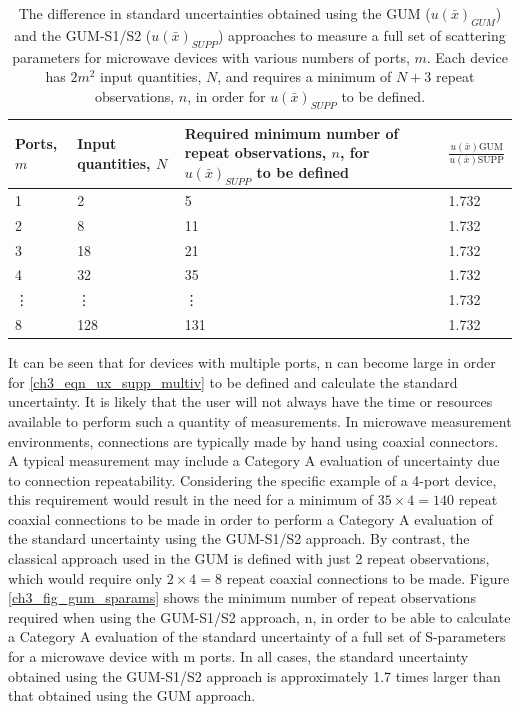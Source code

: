 \documentclass[../thesis/thesis.tex]{subfiles}
\begin{document}
\begin{refsection}
\begin{table}[]
	\begin{tabular}{llp{5cm}l} \toprule
		Ports, $m$         & Input quantities, $N$ & Required minimum number of repeat observations, $n$, for $u(\bar{x})_{SUPP}$ to be defined & $\frac {u(\bar{x})\textrm{GUM}}{u(\bar{x})\textrm{SUPP}}$ \\ \midrule
		     1 &      2 &      5 & 1.732 \\
		     2 &      8 &     11 & 1.732 \\
		     3 &     18 &     21 & 1.732 \\
		     4 &     32 &     35 & 1.732 \\
		     \multicolumn{1}{l}{\vdots}&\multicolumn{1}{l}{\vdots}&\multicolumn{1}{l}{\vdots}&1.732\\
		     8 &    128 &    131 & 1.732 \\ \bottomrule
	\end{tabular}
	\caption{The difference in standard uncertainties obtained using the GUM ($u(\bar{x})_{GUM}$) and the GUM-S1/S2 ($u(\bar{x})_{SUPP}$) approaches to measure a full set of scattering parameters for microwave devices with various numbers of ports, $m$. Each device has $2m^2$ input quantities, $N$, and requires a minimum of $N + 3$ repeat observations, $n$, in order for $u(\bar{x})_{SUPP}$ to be defined.}
	\label{ch3_tbl_sparams}
\end{table}

It can be seen that for devices with multiple ports, n can become large in order for \ref{ch3_eqn_ux_supp_multiv} to be defined and calculate the standard uncertainty. It is likely that the user will not always have the time or resources available to perform such a quantity of measurements. In microwave measurement environments, connections are typically made by hand using coaxial connectors. A typical measurement may include a Category A evaluation of uncertainty due to connection repeatability. Considering the specific example of a 4-port device, this requirement would result in the need for a minimum of $35 \times 4 = 140$ repeat coaxial connections to be made in order to perform a Category A evaluation of the standard uncertainty using the GUM-S1/S2 approach. By contrast, the classical approach used in the GUM is defined with just 2 repeat observations, which would require only $2 \times 4 = 8$ repeat coaxial connections to be made. Figure \ref{ch3_fig_gum_sparams} shows the minimum number of repeat observations required when using the GUM-S1/S2 approach, n, in order to be able to calculate a Category A evaluation of the standard uncertainty of a full set of S-parameters for a microwave device with m ports. In all cases, the standard uncertainty obtained using the GUM-S1/S2 approach is approximately 1.7 times larger than that obtained using the GUM approach.


\end{refsection}
\end{document}
